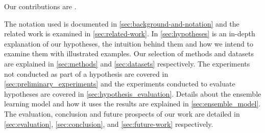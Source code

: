 Our contributions are .

The notation used is documented in \autoref{sec:background-and-notation} and the related work is examined in \autoref{sec:related-work}.
In \autoref{sec:hypotheses} is an in-depth explanation of our hypotheses, the intuition behind them and how we intend to examine them with illustrated examples.
Our selection of methods and datasets are explained in \autoref{sec:methods} and \autoref{sec:datasets} respectively.
The experiments not conducted as part of a hypothesis are covered in \autoref{sec:preliminary_experiments} and the experiments conducted to evaluate hypotheses are covered in \autoref{sec:hypothesis_evaluation}.
Details about the ensemble learning model and how it uses the results are explained in \autoref{sec:ensemble_model}.
The evaluation, conclusion and future prospects of our work are detailed in \autoref{sec:evaluation}, \autoref{sec:conclusion}, and \autoref{sec:future-work} respectively.


\begin{comment}


This paper is a continuation of \cite{P9}, where we found that the quality of the predictions are highly dependant on the target of the prediction. Highest performance was observed on tail predictions, followed by head, relation and time predictions. In this paper, this observation will be more thoroughly examined and tested with more datasets and train/test splits of the data.

In addition, we observed that the best indicator for prediction quality seemed to be the relation type. In this paper, this concept will be expanded, by looking at the relations in the knowledge graph, categorizing them and evaluating the performance of the models over different categories of relations. The relations are categorized into the structural features symmetry, anti-symmetry, inversion, composition and hierarchy, which will be defined in this paper in relation to temporal information. Their temporal nature will also be examined, such as the average duration of events and relations.

Ultimately, the findings will contribute to an ensemble learning model with dynamic weights across different models, depending on the features of the query.
\end{comment}